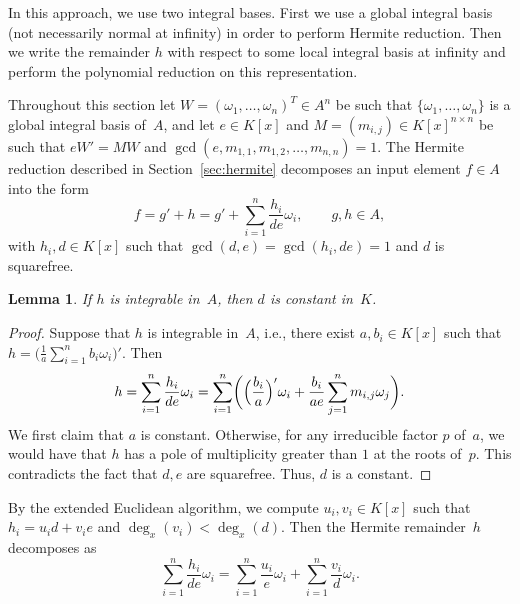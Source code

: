 \documentclass{sig-alternate}
\newtheorem{lemma}[theorem]{Lemma}
\begin{document}
In this approach, we use two integral bases. First we use a global integral basis (not
necessarily normal at infinity) in order to perform Hermite reduction. Then we write the
remainder $h$ with respect to some local integral basis at infinity and perform the
polynomial reduction on this representation.

Throughout this section let $W=(\omega_1,\ldots,\omega_n)^T\in A^n$ be such
that $\{\omega_1, \ldots, \omega_n\}$ is a global integral basis of~$A$, and
let $e\in K[x]$ and $M=(m_{i,j})\in K[x]^{n\times n}$ be such that $eW'=MW$
and $\gcd(e, m_{1, 1}, m_{1, 2}, \ldots, m_{n ,n})=1$. The Hermite reduction
described in Section~\ref{sec:hermite} decomposes an input element $f\in A$
into the form
\[
  f = g' + h = g' + \sum_{i=1}^n \frac{h_i}{de} \omega_i,\qquad
  g, h\in A,
\]
with $h_i, d\in K[x]$ such that $\gcd(d, e)=\gcd(h_i,de)=1$ and $d$ is squarefree.
\begin{lemma}\label{LEM:d}
If $h$ is integrable in~$A$, then $d$ is constant in~$K$.
\end{lemma}
\begin{proof}
Suppose that $h$ is integrable in~$A$, i.e., there exist $a, b_i\in K[x]$
such that $h = \bigl(\frac{1}{a}\sum_{i=1}^n b_i \omega_i\bigr)'$. Then
\[
  h = \sum_{i=1}^n \frac{h_i}{de}\omega_i= \sum_{i=1}^n \biggl(\Bigl(\frac{b_i}{a}\Bigr)' \omega_i +
  \frac{b_i}{a e} \sum_{j=1}^n  m_{i, j}\omega_j\biggr).
\]
We first claim that $a$ is constant. Otherwise, for any irreducible factor $p$ of~$a$, we would have that $h$ has a pole of
multiplicity greater than $1$ at the roots of~$p$. This contradicts
the fact that $d, e$ are squarefree. Thus, $d$ is a constant.
\end{proof}

By the extended Euclidean algorithm, we compute $u_i, v_i\in K[x]$ such that
$h_i = u_i d + v_i e$ and $\deg_x(v_i) < \deg_x(d)$. Then the Hermite remainder~$h$
decomposes as
\begin{equation}\label{EQ:h}
  \sum_{i=1}^n \frac{h_i}{de}\omega_i =  \sum_{i=1}^n \frac{u_i}{e}\omega_i + \sum_{i=1}^n \frac{v_i}{d}\omega_i.
\end{equation}
\end{document}
